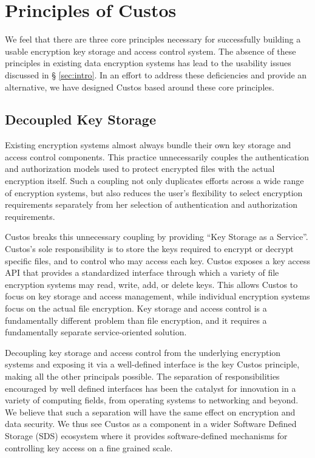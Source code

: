 \section{Principles of Custos}
\label{sec:principles}

We feel that there are three core principles necessary for
successfully building a usable encryption key storage and access
control system. The absence of these principles in existing data
encryption systems has lead to the usability issues discussed in \S
\ref{sec:intro}. In an effort to address these deficiencies and
provide an alternative, we have designed Custos based around these
core principles.

\subsection{Decoupled Key Storage}

Existing encryption systems almost always bundle their own key storage
and access control components. This practice unnecessarily couples the
authentication and authorization models used to protect encrypted
files with the actual encryption itself. Such a coupling not only
duplicates efforts across a wide range of encryption systems, but also
reduces the user's flexibility to select encryption requirements
separately from her selection of authentication and authorization
requirements.

Custos breaks this unnecessary coupling by providing ``Key Storage as
a Service''. Custos's sole responsibility is to store the keys
required to encrypt or decrypt specific files, and to control who may
access each key. Custos exposes a key access API that provides a
standardized interface through which a variety of file encryption
systems may read, write, add, or delete keys. This allows Custos to
focus on key storage and access management, while individual
encryption systems focus on the actual file encryption. Key storage
and access control is a fundamentally different problem than file
encryption, and it requires a fundamentally separate service-oriented
solution.

Decoupling key storage and access control from the underlying
encryption systems and exposing it via a well-defined interface is the
key Custos principle, making all the other principals possible. The
separation of responsibilities encouraged by well defined interfaces
has been the catalyst for innovation in a variety of computing fields,
from operating systems to networking and beyond. We believe that such
a separation will have the same effect on encryption and data
security. We thus see Custos as a component in a wider Software
Defined Storage (SDS) ecosystem where it provides software-defined
mechanisms for controlling key access on a fine grained scale.


